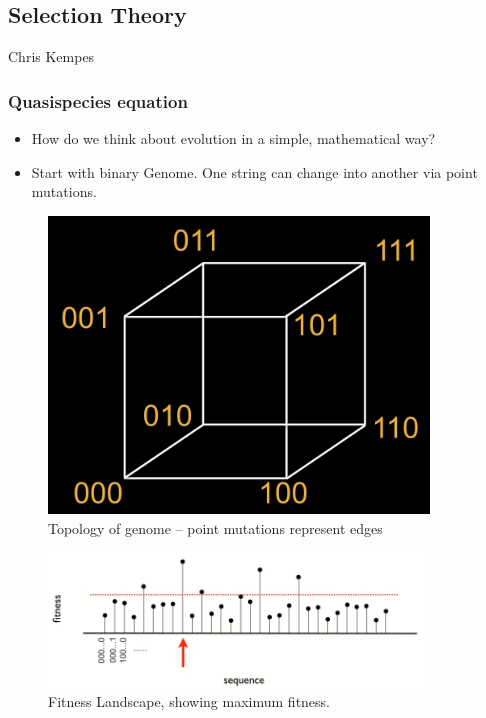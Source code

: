 \documentclass[]{article}
\begin{document}
\subsection{Selection Theory}
Chris Kempes

\subsubsection{Quasispecies equation}
\begin{itemize}
	\item How do we think about evolution in a simple, mathematical way?
	\item Start with binary Genome. One string can change into another via point mutations.
\end{itemize}


\begin{figure}[H]
	\caption{Topology of genome -- point mutations represent edges}\label{fig:GenomeTopology} 
	\includegraphics[width=0.9\textwidth]{GenomeTopology}
\end{figure}

\begin{figure}[H]
	\caption{Fitness Landscape, showing maximum fitness.}\label{fig:FitnessLandscape} 
	\includegraphics[width=0.9\textwidth]{FitnessLandscape}
\end{figure}
\end{document}
